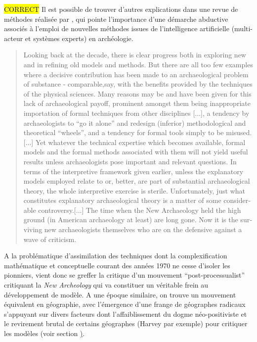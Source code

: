 \hl{CORRECT}
Il est possible de trouver d'autres explications dans une revue de méthodes réalisée par \textcite{Doran1986}, qui pointe l'importance d'une démarche abductive associés à l'emploi de nouvelles méthodes \autocite{Doran1982} issues de l'intelligence artificielle (multi-acteur et systèmes experts) en archéologie.

\foreignblockquote{english}[\cite{Doran1986}]{Looking back at the decade, there is clear progress both in exploring new and in refining old models and methods. But there are all too few examples where a decisive contribution has been made to an archaeological problem of substance - comparable,say, with the benefits provided by the techniques of the physical sciences. Many reasons may be and have been given for this lack of archaeological payoff, prominent amongst them being inappropriate importation of formal techniques from other disciplines [...], a tendency by archaeologists to \enquote{go it alone} and redesign (inferior) methodological and theoretical \enquote{wheels}, and a tendency for formal tools simply to be misused. [...] Yet whatever the technical expertise which becomes available, formal models and the formal methods associated with them will not yield useful results unless archaeologists pose important and relevant questions. In terms of the interpretive framework given earlier, unless the explanatory models employed relate to or, better, are part of substantial archaeological theory, the whole interpretive exercise is sterile. Unfortunately, just what constitutes explanatory archaeological theory is a matter of some considerable controversy.[...] The time when the New Archaeology held the high ground (in American archaeology at least) are long gone. Now it is the surviving new archaeologists themselves who are on the defensive against a wave of criticism.}

A la problématique d'assimilation des techniques dont la complexification mathématique et conceptuelle courant des années 1970 ne cesse d'isoler les pionniers, vient donc se greffer la critique d'un mouvement \foreignquote{english}{post-processualist} critiquant la \textit{New Archeology} qui va constituer un véritable frein au développement de modèle. A une époque similaire, on trouve un mouvement équivalent en géographie, avec l'émergence d'une frange de géographes radicaux s'appuyant sur divers facteurs dont l'affaiblissement du dogme néo-positiviste et le revirement brutal de certains géographes (Harvey par exemple) pour critiquer les modèles (voir section \href{ssec:transition_annee70}).

